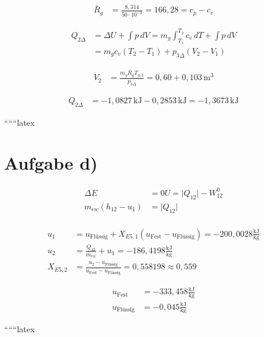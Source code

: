 \begin{align*}
\bar{R}_g &= \frac{8{,}314}{50 \cdot 10^{-3}} = 166{,}28 = c_p - c_v
\end{align*}

\begin{align*}
Q_{2\Delta} &= \Delta U + \int p \, dV = m_g \int_{T_1}^{T_2} c_v \, dT + \int p \, dV \\
&= m_g c_v (T_2 - T_1) + p_{3\Delta} (V_2 - V_1)
\end{align*}

\begin{align*}
V_2 &= \frac{m_g \bar{R}_g T_{g,2}}{p_{3\Delta}} = 0{,}60 + 0{,}103 \, \text{m}^3
\end{align*}

\begin{align*}
Q_{2\Delta} &= -1{,}0827 \, \text{kJ} - 0{,}2853 \, \text{kJ} = -1{,}3673 \, \text{kJ}
\end{align*}

``````latex


\section*{Aufgabe d)}

\begin{align*}
\Delta E &= 0U = \lvert Q_{12} \rvert - W_{12}^0 \\
m_{ew} (h_{12} - u_1) &= \lvert Q_{12} \rvert \\
\end{align*}

\begin{align*}
u_1 &= u_{\text{Flüssig}} + X_{E5,1} (u_{\text{Fest}} - u_{\text{Flüssig}}) = -200,0028 \frac{\text{kJ}}{\text{kg}} \\
u_2 &= \frac{Q_{12}}{m_{ew}} + u_1 = -186,4198 \frac{\text{kJ}}{\text{kg}} \\
X_{E5,2} &= \frac{u_2 - u_{\text{Flüssig}}}{u_{\text{Fest}} - u_{\text{Flüssig}}} = 0,558198 \approx 0,559
\end{align*}

\begin{align*}
u_{\text{Fest}} &= -333,458 \frac{\text{kJ}}{\text{kg}} \\
u_{\text{Flüssig}} &= -0,045 \frac{\text{kJ}}{\text{kg}}
\end{align*}

``````latex


